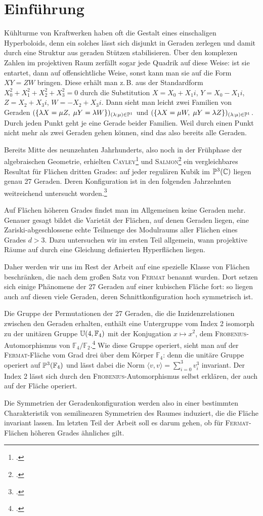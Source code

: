 \chapter{Einführung} \label{chap:intro}
Kühlturme von Kraftwerken haben oft die Gestalt eines einschaligen Hyperboloids, denn ein solches lässt sich disjunkt in Geraden zerlegen und damit durch eine Struktur aus geraden Stützen stabilisieren. Über den komplexen Zahlen im projektiven Raum zerfällt sogar jede Quadrik auf diese Weise: ist sie entartet, dann auf offensichtliche Weise, sonst kann man sie auf die Form $XY = ZW$ bringen. Diese erhält man z.\,B. aus der Standardform $X_0^2+X_1^2+X_2^2+X_3^2=0$ durch die Substitution $X = X_0 + X_1i$, $Y = X_0 - X_1i$, $Z = X_2 + X_3i$, $W = - X_2 + X_3i$. Dann sieht man leicht zwei Familien von Geraden $(\{\lambda X = \mu Z,\; \mu Y = \lambda W\})_{(\lambda:\mu) \in \mathbb P^{1}}$ und $(\{\lambda X = \mu W,\; \mu Y = \lambda Z\})_{(\lambda:\mu) \in \mathbb P^{1}}$. Durch jeden Punkt geht je eine Gerade beider Familien. Weil durch einen Punkt nicht mehr als zwei Geraden gehen können, sind das also bereits alle Geraden.

Bereits Mitte des neunzehnten Jahrhunderts, also noch in der Frühphase der algebraischen Geometrie, erhielten \textsc{Cayley}\footcite{Cayley} und \textsc{Salmon}\footcite{Salmon} ein vergleichbares Resultat für Flächen dritten Grades: auf jeder regulären Kubik im $\mathbb P^{3}(\mathbb C)$ liegen genau 27 Geraden. Deren Konfiguration ist in den folgenden Jahrzehnten weitreichend untersucht worden.\footcite[siehe etwa][]{Henderson}

Auf Flächen höheren Grades findet man im Allgemeinen keine Geraden mehr. Genauer gesagt bildet die Varietät der Flächen, auf denen Geraden liegen, eine Zariski-abgeschlossene echte Teilmenge des Modulraums aller Flächen eines Grades $d > 3$. Dazu untersuchen wir im ersten Teil allgemein, wann projektive Räume auf durch eine Gleichung definierten Hyperflächen liegen.

Daher werden wir uns im Rest der Arbeit auf eine spezielle Klasse von Flächen beschränken, die nach dem großen Satz von \textsc{Fermat} benannt wurden. Dort setzen sich einige Phänomene der 27 Geraden auf einer kubischen Fläche fort: so liegen auch auf diesen viele Geraden, deren Schnittkonfiguration hoch symmetrisch ist.

Die Gruppe der Permutationen der 27 Geraden, die die Inzidenzrelationen zwischen den Geraden erhalten, enthält eine Untergruppe vom Index 2 isomorph zu der unitären Gruppe $\mathbb U(4,\mathbb F_4)$ mit der Konjugation $x \mapsto x^2$, dem \textsc{Frobenius}-Automorphismus von $\mathbb F_4/\mathbb F_2$.\footcite[Aufg.~C--D, S.~180]{Mumford} Wie diese Gruppe operiert, sieht man auf der \textsc{Fermat}-Fläche vom Grad drei über dem Körper $\mathbb F_4$: denn die unitäre Gruppe operiert auf $\mathbb P^{3}(\mathbb F_4)$ und lässt dabei die Norm $\langle v, v \rangle = \sum_{i=0}^3 v_i^3$ invariant. Der Index 2 lässt sich durch den \textsc{Frobenius}-Automorphismus selbst erklären, der auch auf der Fläche operiert.

Die Symmetrien der Geradenkonfiguration werden also in einer bestimmten Charakteristik von semilinearen Symmetrien des Raumes induziert, die die Fläche invariant lassen. Im letzten Teil der Arbeit soll es darum gehen, ob für \textsc{Fermat}-Flächen höheren Grades ähnliches gilt.

